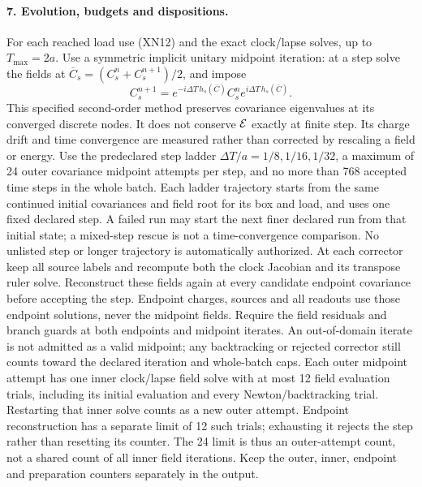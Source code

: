 \documentclass[11pt]{article}
\begin{document}
\paragraph{7. Evolution, budgets and dispositions.}
For each reached load use (XN12) and the exact clock/lapse solves,
up to $T_{\max}=2a$.  Use a symmetric implicit unitary midpoint
iteration: at a step solve the fields at
$\overline C_s=(C_s^n+C_s^{n+1})/2$, and impose
\[
 C_s^{n+1}
  =e^{-i\Delta T\,h_s(\overline C)}C_s^n
                        e^{i\Delta T\,h_s(\overline C)}.
 \tag{XN15}
\]
This specified second-order method preserves covariance eigenvalues
at its converged discrete nodes.  It does not conserve ${\cal E}$
exactly at finite step.  Its charge drift and time convergence are
measured rather than corrected by rescaling a field or energy.
Use the predeclared step ladder
$\Delta T/a=1/8,1/16,1/32$, a maximum of 24 outer covariance
midpoint attempts per step, and no more than 768 accepted time steps in the whole
batch.  Each ladder trajectory starts from the same continued
initial covariances and field root for its box and load, and
uses one fixed declared step.  A failed run may start the next
finer declared run from that initial state; a mixed-step rescue
is not a time-convergence comparison.  No unlisted step or
longer trajectory is automatically authorized.
At each corrector keep all source labels and recompute both the
clock Jacobian and its transpose ruler solve.  Reconstruct these
fields again at every candidate endpoint covariance before
accepting the step.  Endpoint charges, sources and all readouts
use those endpoint solutions, never the midpoint fields.
Require the field residuals and branch guards at both endpoints
and midpoint iterates.  An out-of-domain iterate is not admitted
as a valid midpoint; any backtracking or rejected corrector
still counts toward the declared iteration and whole-batch caps.
Each outer midpoint attempt has one inner clock/lapse field
solve with at most 12 field evaluation trials, including its
initial evaluation and every Newton/backtracking trial.
Restarting that inner solve counts as a new outer attempt.
Endpoint reconstruction has a separate limit of 12 such trials;
exhausting it rejects the step rather than resetting its counter.
The 24 limit is thus an outer-attempt count, not a shared count
of all inner field iterations.  Keep the outer, inner, endpoint
and preparation counters separately in the output.
\end{document}
